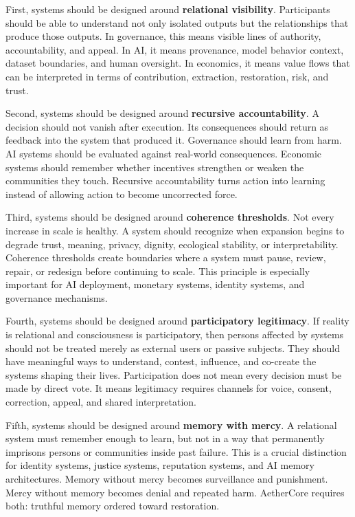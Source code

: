 \documentclass[12pt]{article}
\begin{document}
First, systems should be designed around \textbf{relational visibility}. Participants should be able to understand not only isolated outputs but the relationships that produce those outputs. In governance, this means visible lines of authority, accountability, and appeal. In AI, it means provenance, model behavior context, dataset boundaries, and human oversight. In economics, it means value flows that can be interpreted in terms of contribution, extraction, restoration, risk, and trust.

Second, systems should be designed around \textbf{recursive accountability}. A decision should not vanish after execution. Its consequences should return as feedback into the system that produced it. Governance should learn from harm. AI systems should be evaluated against real-world consequences. Economic systems should remember whether incentives strengthen or weaken the communities they touch. Recursive accountability turns action into learning instead of allowing action to become uncorrected force.

Third, systems should be designed around \textbf{coherence thresholds}. Not every increase in scale is healthy. A system should recognize when expansion begins to degrade trust, meaning, privacy, dignity, ecological stability, or interpretability. Coherence thresholds create boundaries where a system must pause, review, repair, or redesign before continuing to scale. This principle is especially important for AI deployment, monetary systems, identity systems, and governance mechanisms.

Fourth, systems should be designed around \textbf{participatory legitimacy}. If reality is relational and consciousness is participatory, then persons affected by systems should not be treated merely as external users or passive subjects. They should have meaningful ways to understand, contest, influence, and co-create the systems shaping their lives. Participation does not mean every decision must be made by direct vote. It means legitimacy requires channels for voice, consent, correction, appeal, and shared interpretation.

Fifth, systems should be designed around \textbf{memory with mercy}. A relational system must remember enough to learn, but not in a way that permanently imprisons persons or communities inside past failure. This is a crucial distinction for identity systems, justice systems, reputation systems, and AI memory architectures. Memory without mercy becomes surveillance and punishment. Mercy without memory becomes denial and repeated harm. AetherCore requires both: truthful memory ordered toward restoration.
\end{document}

